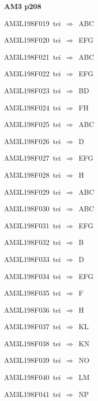 \par\vfill\eject
{\bf\hfill AM3 p208\hfill\hbox{}}\par\bigskip
{\sixrm AM3L198F019\ {\sixit tei}\ }$\Rightarrow$\ ABC\par\smallskip
{\sixrm AM3L198F020\ {\sixit tei}\ }$\Rightarrow$\ EFG\par\smallskip
{\sixrm AM3L198F021\ {\sixit tei}\ }$\Rightarrow$\ ABC\par\smallskip
{\sixrm AM3L198F022\ {\sixit tei}\ }$\Rightarrow$\ EFG\par\smallskip
{\sixrm AM3L198F023\ {\sixit tei}\ }$\Rightarrow$\ BD\par\smallskip
{\sixrm AM3L198F024\ {\sixit tei}\ }$\Rightarrow$\ FH\par\smallskip
{\sixrm AM3L198F025\ {\sixit tei}\ }$\Rightarrow$\ ABC\par\smallskip
{\sixrm AM3L198F026\ {\sixit tei}\ }$\Rightarrow$\ D\par\smallskip
{\sixrm AM3L198F027\ {\sixit tei}\ }$\Rightarrow$\ EFG\par\smallskip
{\sixrm AM3L198F028\ {\sixit tei}\ }$\Rightarrow$\ H\par\smallskip
{\sixrm AM3L198F029\ {\sixit tei}\ }$\Rightarrow$\ ABC\par\smallskip
{\sixrm AM3L198F030\ {\sixit tei}\ }$\Rightarrow$\ ABC\par\smallskip
{\sixrm AM3L198F031\ {\sixit tei}\ }$\Rightarrow$\ EFG\par\smallskip
{\sixrm AM3L198F032\ {\sixit tei}\ }$\Rightarrow$\ B\par\smallskip
{\sixrm AM3L198F033\ {\sixit tei}\ }$\Rightarrow$\ D\par\smallskip
{\sixrm AM3L198F034\ {\sixit tei}\ }$\Rightarrow$\ EFG\par\smallskip
{\sixrm AM3L198F035\ {\sixit tei}\ }$\Rightarrow$\ F\par\smallskip
{\sixrm AM3L198F036\ {\sixit tei}\ }$\Rightarrow$\ H\par\smallskip
{\sixrm AM3L198F037\ {\sixit tei}\ }$\Rightarrow$\ KL\par\smallskip
{\sixrm AM3L198F038\ {\sixit tei}\ }$\Rightarrow$\ KN\par\smallskip
{\sixrm AM3L198F039\ {\sixit tei}\ }$\Rightarrow$\ NO\par\smallskip
{\sixrm AM3L198F040\ {\sixit tei}\ }$\Rightarrow$\ LM\par\smallskip
{\sixrm AM3L198F041\ {\sixit tei}\ }$\Rightarrow$\ NP\par\smallskip

